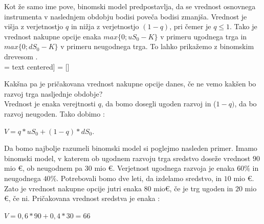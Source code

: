 \documentclass[12pt, a4paper]{amsart}
\theoremstyle{definition} %
\theoremstyle{plain} %
\begin{document}
Kot že samo ime pove, binomski model predpostavlja, da se vrednost osnovnega instrumenta v naslednjem obdobju bodisi poveča bodisi zmanjša. Vrednost je višja z verjetnostjo $q$ in nižja z verjetnostjo $(1-q)$, pri čemer je $q \leq 1$. Tako je vrednost nakupne opcije enaka $max\{0; uS_0 - K\}$ v primeru ugodnega trga in $max\{0; dS_0 - K\}$ v primeru neugodnega trga. To lahko prikažemo z binomskim drevesom \cite[str. 52, 53]{Brach}.\\

 =  text centered]
 = []

Kakšna pa je pričakovana vrednost nakupne opcije danes, če ne vemo kakšen bo razvoj trga nasljednje obdobje? \\
Vrednost je enaka verejtnosti $q$, da bomo dosegli ugoden razvoj in ($1-q)$, da bo razvoj neugoden. Tako dobimo \cite[str. 52]{Brach}:
\begin{center}
$V = q * uS_0 + (1-q) * dS_0$.
\end{center}

Da bomo najbolje razumeli binomski model si poglejmo nasleden primer. Imamo binomski model, v katerem ob ugodnem razvoju trga sredstvo doseže vrednost $90$ mio €, ob neugodnem pa $30$ mio €. Verjetnost ugodnega razvoja je enaka $60 \%$ in neugodnega $40 \%$. Potrebovali bomo dve leti, da izdelamo sredstvo, in $10$ mio €. Zato je vrednost nakupne opcije jutri enaka $80$ mio€, če je trg ugoden in $20$ mio €, če ni. Pričakovana vrednost sredstva je enaka \cite[str. 52, 53]{Brach}: 
\begin{center}
$V = 0,6 * 90 + 0,4 * 30 = 66$
\end{center}
\end{document}
